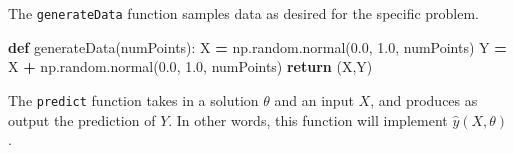 \documentclass[12pt, twoside]{amherstthesis}
\newenvironment{Shaded}{\begin{snugshade}}{\end{snugshade}}
\newcommand{\ControlFlowTok}[1]{\textcolor[rgb]{0.13,0.29,0.53}{\textbf{#1}}}
\newcommand{\FloatTok}[1]{\textcolor[rgb]{0.00,0.00,0.81}{#1}}
\newcommand{\KeywordTok}[1]{\textcolor[rgb]{0.13,0.29,0.53}{\textbf{#1}}}
\newcommand{\NormalTok}[1]{#1}
\newcommand{\OperatorTok}[1]{\textcolor[rgb]{0.81,0.36,0.00}{\textbf{#1}}}
\begin{document}
\noindent The \texttt{generateData} function samples data as desired for the specific problem.
\begin{Shaded}
\begin{Highlighting}[]
\KeywordTok{def}\NormalTok{ generateData(numPoints):}
\NormalTok{    X }\OperatorTok{=}\NormalTok{     np.random.normal(}\FloatTok{0.0}\NormalTok{, }\FloatTok{1.0}\NormalTok{, numPoints) }
\NormalTok{    Y }\OperatorTok{=}\NormalTok{ X }\OperatorTok{+}\NormalTok{ np.random.normal(}\FloatTok{0.0}\NormalTok{, }\FloatTok{1.0}\NormalTok{, numPoints) }
    \ControlFlowTok{return}\NormalTok{ (X,Y)}
\end{Highlighting}
\end{Shaded}
\noindent The \texttt{predict} function takes in a solution \(\theta\) and an input \(X\), and produces as output the prediction of \(Y\). In other words, this function will implement \(\hat{y}(X, \theta)\).
\end{document}
